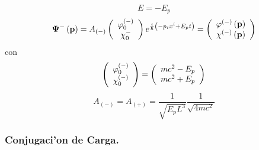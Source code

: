 \begin{equation}
E=-E_{p}%
\end{equation}
\begin{equation}
\mathbf{\Psi}^{-}\left(  \mathbf{p}\right)  =A_{\left(  -\right)  }\left(
\begin{array}
[c]{c}%
\varphi_{0}^{\left(  -\right)  }\\
\chi_{0}^{-}%
\end{array}
\right)  e^{\frac{i}{\hbar}\left(  -p_{i}x^{i}+E_{p}t\right)  }=\left(
\begin{array}
[c]{c}%
\varphi^{\left(  -\right)  }\left(  \mathbf{p}\right) \\
\chi^{\left(  -\right)  }\left(  \mathbf{p}\right)
\end{array}
\right)
\end{equation}
con
\begin{equation}
\left(
\begin{array}
[c]{c}%
\varphi_{0}^{\left(  -\right)  }\\
\chi_{0}^{\left(  -\right)  }%
\end{array}
\right)  =\left(
\begin{array}
[c]{c}%
mc^{2}-E_{p}\\
mc^{2}+E_{p}%
\end{array}
\right)
\end{equation}
\begin{equation}
A_{\left(  -\right)  }=A_{\left(  +\right)  }=\frac{1}{\sqrt{E_{p}L^{3}}}%
\frac{1}{\sqrt{4mc^{2}}}%
\end{equation}


\subsubsection{Conjugaci'on de Carga.}%


